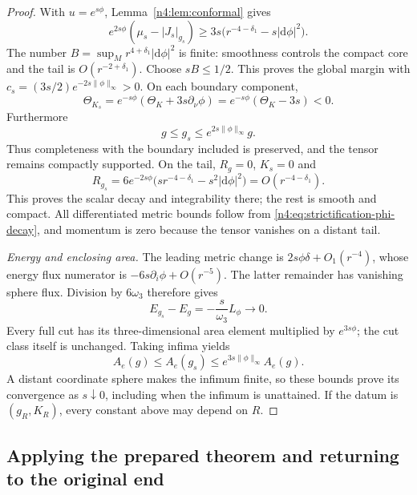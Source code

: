 \begin{proof}
With $u=e^{s\phi}$, Lemma~\ref{n4:lem:conformal} gives
\[
 e^{2s\phi}(\mu_s-|J_s|_{g_s})
 \ge3s\bigl(r^{-4-\delta_1}-s|\mathrm d\phi|^2\bigr).
\]
The number $B=\sup_M r^{4+\delta_1}|\mathrm d\phi|^2$ is finite:
smoothness controls the compact core and the tail is $O(r^{-2+\delta_1})$.
Choose $sB\le1/2$. This proves the global margin with
$c_s=(3s/2)e^{-2s\|\phi\|_\infty}>0$. On each boundary component,
\[
 \Theta_{K_s}=e^{-s\phi}(\Theta_K+3s\partial_\nu\phi)
            =e^{-s\phi}(\Theta_K-3s)<0.
\]
Furthermore
\begin{equation}\label{n4:eq:strictification-metric-comparison}
 g\le g_s\le e^{2s\|\phi\|_\infty}g.
\end{equation}
Thus completeness with the boundary included is preserved, and the
tensor remains compactly supported. On the tail, $R_g=0$, $K_s=0$ and
\[
 R_{g_s}=6e^{-2s\phi}
       \bigl(sr^{-4-\delta_1}-s^2|\mathrm d\phi|^2\bigr)
       =O(r^{-4-\delta_1}).
\]
This proves the scalar decay and integrability there; the rest is smooth
and compact. All differentiated metric bounds follow from
\eqref{n4:eq:strictification-phi-decay}, and momentum is zero because
the tensor vanishes on a distant tail.

\smallskip
\noindent\emph{Energy and enclosing area.} The leading metric change is
$2s\phi\delta+O_1(r^{-4})$, whose energy
flux numerator is $-6s\partial_i\phi+O(r^{-5})$. The latter remainder
has vanishing sphere flux. Division by $6\omega_3$ therefore gives
\begin{equation}\label{n4:eq:strictification-energy}
 E_{g_s}-E_g=-\frac{s}{\omega_3}L_\phi\longrightarrow0.
\end{equation}
Every full cut has its three-dimensional area element multiplied by
$e^{3s\phi}$; the cut class itself is unchanged. Taking infima yields
\begin{equation}\label{n4:eq:strictification-area}
 A_e(g)\le A_e(g_s)\le e^{3s\|\phi\|_\infty}A_e(g).
\end{equation}
A distant coordinate sphere makes the infimum finite, so these bounds
prove its convergence as $s\downarrow0$, including when the infimum is
unattained. If the datum is $(g_R,K_R)$, every constant above may depend
on $R$.
\end{proof}

\subsection{Applying the prepared theorem and returning to the original end}

